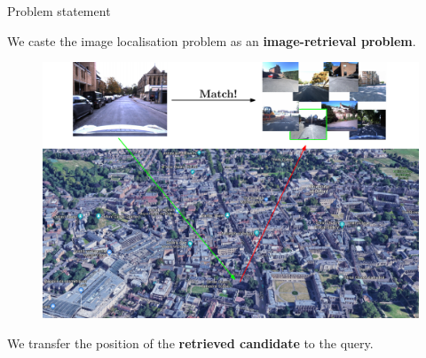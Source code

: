 \begin{frame}{Problem statement}
{\begin{figure}
	\end{figure}
	\vfill	
	We caste the image localisation problem as an \textbf{image-retrieval problem}.
	}
	{
	\vfill
	\begin{figure}
		\includegraphics[width=0.8\linewidth]{vect/intro/fig1/4}
	\end{figure}
	\vfill	
	We transfer the position of the \textbf{retrieved candidate} to the query.
	}
\end{frame}

